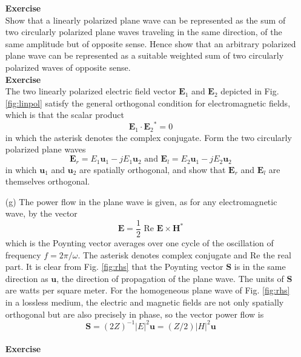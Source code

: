 \begin{itemize}
\noindent \textbf{Exercise}\\
\noindent Show that a linearly polarized plane wave can be represented as the sum of two circularly polarized plane waves traveling in the same direction, of the same amplitude but of opposite sense. Hence show that an arbitrary polarized plane wave can be represented as a suitable weighted sum of two circularly polarized waves of opposite sense.\\
\noindent \textbf{Exercise}\\
\noindent The two linearly polarized electric field vector $\mathbf{E}_1$ and $\mathbf{E}_2$ depicted in Fig. \ref{fig:linpol} satisfy the general orthogonal condition for electromagnetic fields, which is that the scalar product
\begin{equation}
\mathbf{E}_1\cdot{\mathbf{E}_2}^*=0
\end{equation}
in which the asterisk denotes the complex conjugate. Form the two circularly polarized plane waves
\begin{equation}
\mathbf{E}_r=E_1\mathbf{u}_1-jE_1\mathbf{u}_2 \text{ and } \mathbf{E}_l=E_2\mathbf{u}_1-jE_2\mathbf{u}_2
\end{equation}
in which $\mathbf{u}_1$ and $\mathbf{u}_2$ are spatially orthogonal, and show that $\mathbf{E}_r$ and $\mathbf{E}_l$ are themselves orthogonal.\\
	\item [(g)] 
	The power flow in the plane wave is given, as for any electromagnetic wave, by the vector
	\begin{equation}
	\mathbf{E}=\frac{1}{2}\text{ Re }\mathbf{E}\times\mathbf{H}^*
	\label{eq:powflo}
	\end{equation}
	which is the Poynting vector averages over one cycle of the oscillation of frequency $f=2\pi/\omega$. The asterisk denotes complex conjugate and Re the real part. It is clear from Fig. \ref{fig:rhs} that the Poynting vector $\mathbf{S}$ is in the same direction as $\mathbf{u}$, the direction of propagation of the plane wave. The units of $\mathbf{S}$ are watts per square meter. For the homogeneous plane wave of Fig. \ref{fig:rhs} in a lossless medium, the electric and magnetic fields are not only spatially orthogonal but are also precisely in phase, so the vector power flow is
	\begin{equation}
	\mathbf{S}=(2Z)^{-1}|E|^2\mathbf{u}=(Z/2)|H|^2\mathbf{u}
	\end{equation}\\
\noindent \textbf{Exercise}\\

\end{itemize}

